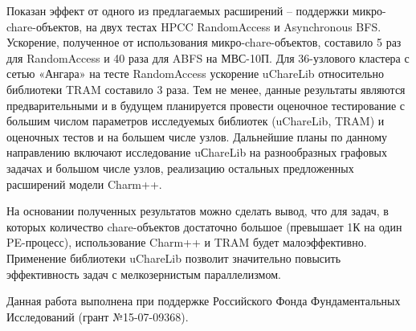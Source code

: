 \documentclass[11pt, oneside, a4paper]{article}
\begin{document}
Показан эффект от одного из предлагаемых расширений – поддержки микро-chare-объектов, на двух тестах HPCC RandomAccess и Asynchronous BFS. 
Ускорение, полученное от использования микро-chare-объектов, составило 5 раз для RandomAccess и 40 раза для ABFS на МВС-10П. Для 36-узлового 
кластера с сетью «Ангара» на тесте RandomAccess ускорение uChareLib относительно библиотеки TRAM составило 3 раза. Тем не менее, данные 
результаты являются предварительными и в будущем планируется провести оценочное тестирование с большим числом параметров исследуемых библиотек 
(uChareLib, TRAM) и оценочных тестов и на большем числе узлов. Дальнейшие планы по данному направлению включают исследование uСhareLib на разнообразных графовых 
задачах и большом числе узлов, реализацию остальных предложенных расширений модели Charm++.

На основании полученных результатов можно сделать вывод, что для задач, в которых количество chare-объектов достаточно большое (превышает 
1К на один PE-процесс), использование Charm++ и TRAM будет малоэффективно. Применение библиотеки uChareLib позволит 
значительно повысить эффективность задач с мелкозернистым параллелизмом.

Данная работа выполнена при поддержке Российского Фонда Фундаментальных Исследований (грант №15-07-09368).

{}
%


\onecolumn
\newpage
\end{document}
